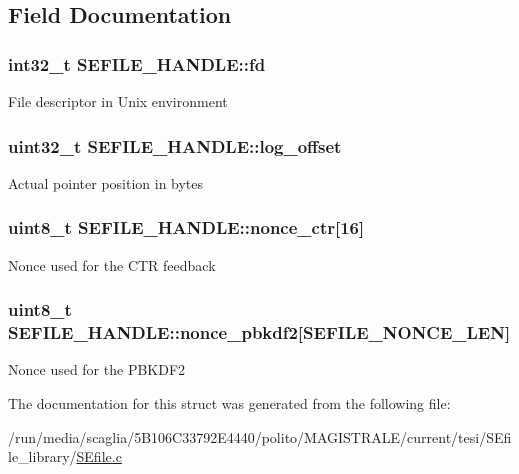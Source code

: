 \subsection{Field Documentation}
\hypertarget{struct_s_e_f_i_l_e___h_a_n_d_l_e_a17bc7f2e296f61d7758cb18e68d41375}{
\subsubsection[{fd}]{\setlength{\rightskip}{0pt plus 5cm}int32\-\_\-t S\-E\-F\-I\-L\-E\-\_\-\-H\-A\-N\-D\-L\-E\-::fd}}\label{struct_s_e_f_i_l_e___h_a_n_d_l_e_a17bc7f2e296f61d7758cb18e68d41375}
File descriptor in Unix environment \hypertarget{struct_s_e_f_i_l_e___h_a_n_d_l_e_a507fef27d36d8ad4550276f9abf84ebb}{
\subsubsection[{log\-\_\-offset}]{\setlength{\rightskip}{0pt plus 5cm}uint32\-\_\-t S\-E\-F\-I\-L\-E\-\_\-\-H\-A\-N\-D\-L\-E\-::log\-\_\-offset}}\label{struct_s_e_f_i_l_e___h_a_n_d_l_e_a507fef27d36d8ad4550276f9abf84ebb}
Actual pointer position in bytes \hypertarget{struct_s_e_f_i_l_e___h_a_n_d_l_e_a37935da2e79760bd04e32e05e5922975}{
\subsubsection[{nonce\-\_\-ctr}]{\setlength{\rightskip}{0pt plus 5cm}uint8\-\_\-t S\-E\-F\-I\-L\-E\-\_\-\-H\-A\-N\-D\-L\-E\-::nonce\-\_\-ctr\mbox{[}16\mbox{]}}}\label{struct_s_e_f_i_l_e___h_a_n_d_l_e_a37935da2e79760bd04e32e05e5922975}
Nonce used for the C\-T\-R feedback \hypertarget{struct_s_e_f_i_l_e___h_a_n_d_l_e_a6d2cb56237e6a99def8f9e9e54a46489}{
\subsubsection[{nonce\-\_\-pbkdf2}]{\setlength{\rightskip}{0pt plus 5cm}uint8\-\_\-t S\-E\-F\-I\-L\-E\-\_\-\-H\-A\-N\-D\-L\-E\-::nonce\-\_\-pbkdf2\mbox{[}S\-E\-F\-I\-L\-E\-\_\-\-N\-O\-N\-C\-E\-\_\-\-L\-E\-N\mbox{]}}}\label{struct_s_e_f_i_l_e___h_a_n_d_l_e_a6d2cb56237e6a99def8f9e9e54a46489}
Nonce used for the P\-B\-K\-D\-F2 

The documentation for this struct was generated from the following file\-:\begin{DoxyCompactItemize}
\item 
/run/media/scaglia/5\-B106\-C33792\-E4440/polito/\-M\-A\-G\-I\-S\-T\-R\-A\-L\-E/current/tesi/\-S\-Efile\-\_\-library/\hyperlink{_s_efile_8c}{S\-Efile.\-c}\end{DoxyCompactItemize}
